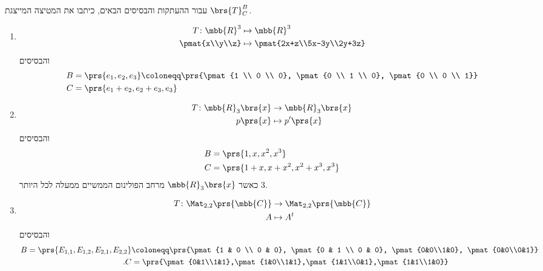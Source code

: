 \documentclass[a4paper,10pt,twoside,openany]{article}
\begin{document}
\begin{exercise}
עבור ההעתקות והבסיסים הבאים, כיתבו את המטיצה המייצגת
$\brs{T}^B_C$.

\begin{enumerate}
\item
\begin{align*}
T \colon \mbb{R}^3 &\mapsto \mbb{R}^3 \\
\pmat{x\\y\\z} &\mapsto \pmat{2x+z\\5x-3y\\2y+3z}
\end{align*}
והבסיסים
\begin{align*}
B &= \prs{e_1, e_2, e_3} \coloneqq \prs{\pmat{1 \\ 0 \\ 0}, \pmat{0 \\ 1 \\ 0}, \pmat{0 \\ 0 \\ 1}} \\
C &= \prs{e_1+e_2, e_2 + e_3, e_3}
\end{align*}

\item \begin{align*}
T \colon \mbb{R}_3\brs{x} &\to \mbb{R}_3\brs{x} \\
p\prs{x} &\mapsto p'\prs{x}
\end{align*}
והבסיסים
\begin{align*}
B &= \prs{1,x,x^2,x^3} \\
C &= \prs{1+x,x+x^2,x^2+x^3,x^3}
\end{align*}
כאשר
$\mbb{R}_3\brs{x}$
מרחב הפולינום הממשיים ממעלה לכל היותר
$3$.

\item
\begin{align*}
T \colon \Mat_{2,2}\prs{\mbb{C}} &\to \Mat_{2,2}\prs{\mbb{C}} \\
A &\mapsto A^t
\end{align*}
והבסיסים
\begin{align*}
B = \prs{E_{1,1}, E_{1,2}, E_{2,1}, E_{2,2}} &\coloneqq \prs{\pmat{1 & 0 \\ 0 & 0}, \pmat{0 & 1 \\ 0 & 0}, \pmat{0&0\\1&0}, \pmat{0&0\\0&1}} \\
\text{.} C &= \prs{\pmat{0&1\\1&1},\pmat{1&0\\1&1},\pmat{1&1\\0&1},\pmat{1&1\\1&0}}
\end{align*}
\end{enumerate}
\end{exercise}
\end{document}
